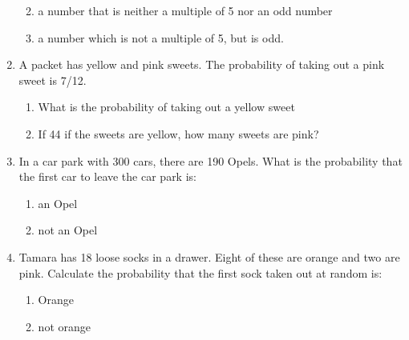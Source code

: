 \begin{enumerate}[noitemsep, label=\textbf{\arabic*}. ]
\begin{enumerate}[noitemsep, label=\textbf{\alph*}. ]
\label{m39373*uid110}\item a number that is neither a multiple of 5 nor an odd
number
\label{m39373*uid111}\item a number which is not a multiple of 5, but is odd.
\end{enumerate}
                \label{m39373*uid112}\item A packet has yellow and pink sweets. The probability
of taking out a pink sweet is 7/12.
\label{m39373*id116002}\begin{enumerate}[noitemsep, label=\textbf{\alph*}. ] 
            \label{m39373*uid113}\item What is the probability of taking
out a yellow sweet
\label{m39373*uid114}\item If 44 if the sweets are yellow, how many sweets are
pink?
\end{enumerate}
                \label{m39373*uid115}\item In a car park with 300 cars, there are 190 Opels. What
is the probability that the first car to leave the car park is:
\label{m39373*id116044}\begin{enumerate}[noitemsep, label=\textbf{\alph*}. ] 
            \label{m39373*uid116}\item an Opel
\label{m39373*uid117}\item not an Opel
\end{enumerate}
                \label{m39373*uid118}\item Tamara has 18 loose socks in a drawer. Eight of these
are orange and two are pink. Calculate the probability that the first sock taken
out at random is:
\label{m39373*id116086}\begin{enumerate}[noitemsep, label=\textbf{\alph*}. ] 
            \label{m39373*uid119}\item Orange
\label{m39373*uid120}\item not orange

\end{enumerate}
\end{enumerate}
